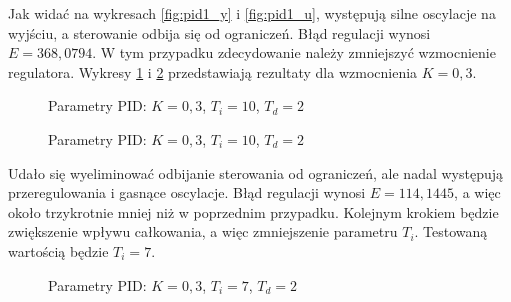 Jak widać na wykresach \ref{fig:pid1_y} i \ref{fig:pid1_u}, występują silne oscylacje na wyjściu, a sterowanie odbija się od ograniczeń. Błąd regulacji wynosi $E=368,0794$. W tym przypadku zdecydowanie należy zmniejszyć wzmocnienie regulatora. Wykresy \ref{fig:pid2_y} i \ref{fig:pid2_u} przedstawiają rezultaty dla wzmocnienia $K=0,3$.

\begin{figure}[H]
\centering
{}
\caption{Parametry PID: $K=0,3$, $T_i=10$, $T_d=2$}
\label{fig:pid2_y}
\end{figure}

\begin{figure}[H]
\centering
{}
\caption{Parametry PID: $K=0,3$, $T_i=10$, $T_d=2$}
\label{fig:pid2_u}
\end{figure}

Udało się wyeliminować odbijanie sterowania od ograniczeń, ale nadal występują przeregulowania i gasnące oscylacje. Błąd regulacji wynosi $E=114,1445$, a więc około trzykrotnie mniej niż w poprzednim przypadku. Kolejnym krokiem będzie zwiększenie wpływu całkowania, a więc zmniejszenie parametru $T_i$. Testowaną wartością będzie $T_i=7$.

\begin{figure}[H]
\centering
{}
\caption{Parametry PID: $K=0,3$, $T_i=7$, $T_d=2$}
\label{fig:pid3_y}
\end{figure}


